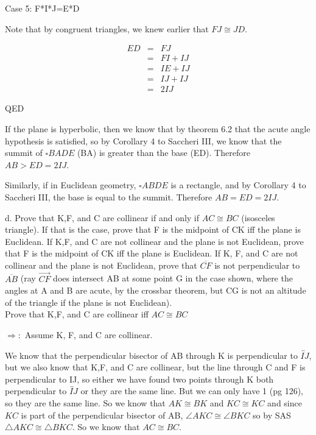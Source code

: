 \documentclass[12pt,letterpaper]{article}
\newcommand{\Proof}{\noindent {\bf Proof: }}
\newcommand{\QED}{\begin{flushright}QED\end{flushright}}
\begin{document}
Case 5: F*I*J=E*D

Note that by congruent triangles, we knew earlier that $FJ \cong JD$.  

\begin{eqnarray*}
ED &=& FJ \\
&=& FI + IJ \\
&=& IE + IJ \\
&=& IJ + IJ\\
&=& 2IJ
\end{eqnarray*}

\QED


If the plane is hyperbolic, then we know that by theorem 6.2 that the acute angle hypothesis is satisfied, so by Corollary 4 to Saccheri III, we know that the summit of $\square BADE$ (BA) is greater than the base (ED).  Therefore $AB > ED = 2IJ$.  

Similarly, if in Euclidean geometry, $\square ABDE$ is a rectangle, and by Corollary 4 to Saccheri III, the base is equal to the summit.  Therefore $AB = ED = 2IJ$.  






\newpage 

d. Prove that K,F, and C are collinear if and only if $AC \cong BC$ (isosceles triangle).  If that is the case, prove that F is the midpoint of CK iff the plane is Euclidean.  If K,F, and C are not collinear and the plane is not Euclidean, prove that F is the midpoint of CK iff the plane is Euclidean.  If K, F, and C are not collinear and the plane is not Euclidean, prove that $\overline{CF}$ is not perpendicular to $\overline{AB}$ (ray $\overrightarrow{CF}$ does intersect AB at some point G in the case shown, where the angles at A and B are acute, by the crossbar theorem, but CG is not an altitude of the triangle if the plane is not Euclidean).\\

Prove that K,F, and C are collinear iff $AC \cong BC$\\

\Proof

$\Rightarrow:$  Assume K, F, and C are collinear.

We know that the perpendicular bisector of AB through K is perpendicular to $\overleftrightarrow{IJ}$, but we also know that K,F, and C are collinear, but the line through C and F is perpendicular to IJ, so either we have found two points through K both perpendicular to $\overleftrightarrow{IJ}$ or they are the same line.  But we can only have 1 (pg 126), so they are the same line.  So we know that $AK\cong BK$ and $KC \cong KC$ and since $KC$ is part of the perpendicular bisector of AB, $\angle AKC \cong \angle BKC$ so by SAS $\triangle AKC \cong \triangle BKC$. So we know that $AC \cong BC$.
\end{document}
